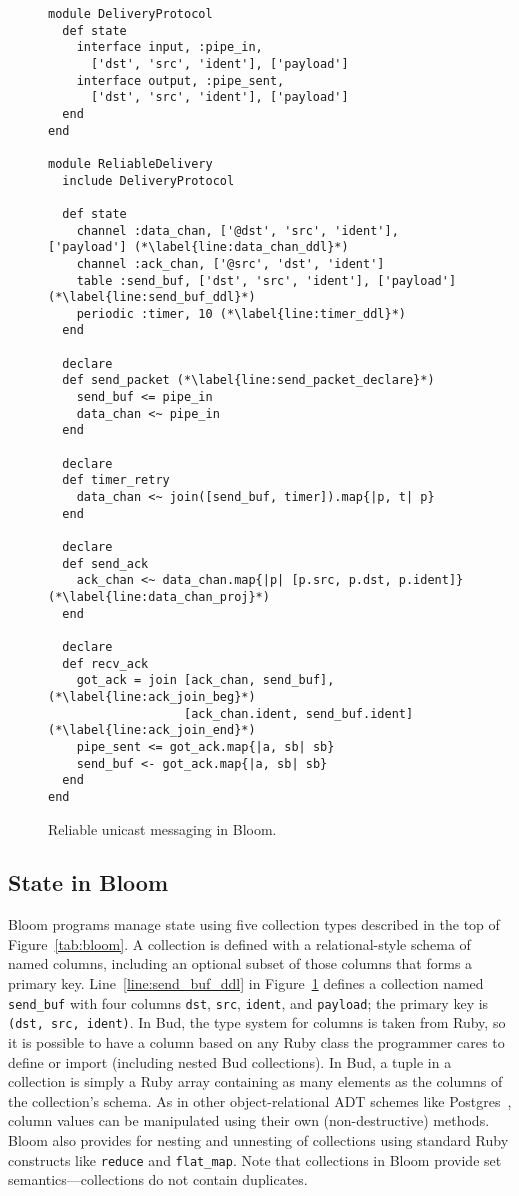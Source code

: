 \begin{figure}[t]
\begin{scriptsize}
\begin{lstlisting}
module DeliveryProtocol
  def state
    interface input, :pipe_in,
      ['dst', 'src', 'ident'], ['payload']
    interface output, :pipe_sent,
      ['dst', 'src', 'ident'], ['payload']
  end
end

module ReliableDelivery
  include DeliveryProtocol

  def state
    channel :data_chan, ['@dst', 'src', 'ident'], ['payload'] (*\label{line:data_chan_ddl}*)
    channel :ack_chan, ['@src', 'dst', 'ident']
    table :send_buf, ['dst', 'src', 'ident'], ['payload'] (*\label{line:send_buf_ddl}*)
    periodic :timer, 10 (*\label{line:timer_ddl}*)
  end

  declare
  def send_packet (*\label{line:send_packet_declare}*)
    send_buf <= pipe_in
    data_chan <~ pipe_in
  end

  declare
  def timer_retry
    data_chan <~ join([send_buf, timer]).map{|p, t| p}
  end

  declare
  def send_ack
    ack_chan <~ data_chan.map{|p| [p.src, p.dst, p.ident]} (*\label{line:data_chan_proj}*)
  end

  declare
  def recv_ack
    got_ack = join [ack_chan, send_buf], (*\label{line:ack_join_beg}*)
                   [ack_chan.ident, send_buf.ident] (*\label{line:ack_join_end}*)
    pipe_sent <= got_ack.map{|a, sb| sb}
    send_buf <- got_ack.map{|a, sb| sb}
  end
end
\end{lstlisting}
\centering
\vspace{-10pt}
\caption{Reliable unicast messaging in Bloom.}
\label{fig:bloom-example}
\end{scriptsize}
\vspace{-2pt}
\end{figure}

\subsection{State in Bloom}
Bloom programs manage state using five collection types described in the top of
Figure~\ref{tab:bloom}. A collection is defined with a relational-style schema
of named columns, including an optional subset of those columns that forms a
primary key. Line~\ref{line:send_buf_ddl} in Figure~\ref{fig:bloom-example}
defines a collection named \texttt{send\_buf} with four columns \texttt{dst},
\texttt{src}, \texttt{ident}, and \texttt{payload}; the primary key is
\texttt{(dst,~src,~ident)}. In Bud, the type system for columns is taken from
Ruby, so it is possible to have a column based on any Ruby class the programmer
cares to define or import (including nested Bud collections).  In Bud, a tuple
in a collection is simply a Ruby array containing as many elements as the
columns of the collection's schema.  As in other object-relational ADT schemes
like Postgres~\cite{postgres-adt}, column values can be manipulated using their
own (non-destructive) methods. Bloom also provides for nesting and unnesting of
collections using standard Ruby constructs like \texttt{reduce} and
\texttt{flat\_map}. Note that collections in Bloom provide set
semantics---collections do not contain duplicates.

